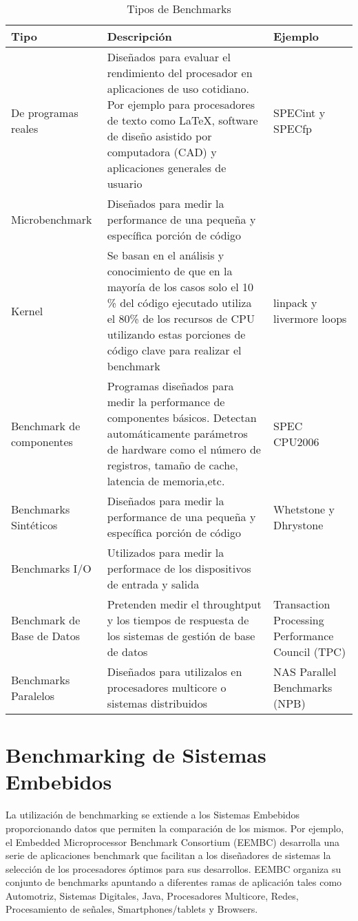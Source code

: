 \begin {table}[!h]
\begin{tabular}{ p{2.5cm} p{8cm} p{3cm} }
\hline 
\rowcolor[gray]{0.8} Tipo & Descripción & Ejemplo \\
\hline
De programas reales & Diseñados para evaluar el
rendimiento del procesador en aplicaciones de uso
cotidiano. Por ejemplo para procesadores de texto como \LaTeX, software
de diseño asistido por computadora (CAD) y
aplicaciones generales de usuario & SPECint y SPECfp\\
\hline
Microbenchmark & Diseñados para medir la performance
de una pequeña y específica porción de código \\
\hline
Kernel & Se basan en el análisis y conocimiento de
que en la mayoría de los casos solo el 10 \% del
código ejecutado utiliza el 80\% de los recursos de
CPU utilizando estas porciones de código clave para
realizar el benchmark & linpack y
livermore loops\\
\hline
Benchmark de componentes & Programas diseñados para
medir la performance de componentes básicos. Detectan
automáticamente parámetros de hardware como el número
de registros, tamaño de cache, latencia de
memoria,etc. & SPEC CPU2006\\
\hline
Benchmarks Sintéticos & Diseñados para medir la
performance de una pequeña y específica porción de
código & Whetstone y Dhrystone\\
\hline
Benchmarks I/O & Utilizados para medir la performace
de los dispositivos de entrada y salida & \\
\hline
Benchmark de Base de Datos & Pretenden medir el
throughtput y los tiempos de respuesta de los sistemas
de gestión de base de datos & Transaction Processing
Performance Council (TPC)\\
\hline
Benchmarks Paralelos & Diseñados para utilizalos
en procesadores multicore o sistemas distribuidos &
NAS Parallel Benchmarks (NPB)\\
\hline
\end{tabular}
\caption {Tipos de Benchmarks}
\label{tab:bench}
\end{table}

\section{Benchmarking de Sistemas Embebidos}

La utilización de benchmarking se extiende a los Sistemas Embebidos
proporcionando datos que permiten la comparación de los mismos. Por
ejemplo, el Embedded Microprocessor Benchmark Consortium (EEMBC)
desarrolla una serie de aplicaciones benchmark que facilitan a los
diseñadores de sistemas la selección de los procesadores óptimos para
sus desarrollos. EEMBC organiza su conjunto de benchmarks apuntando a
diferentes ramas de aplicación tales como Automotriz, Sistemas
Digitales, Java, Procesadores Multicore, Redes, Procesamiento de
señales, Smartphones/tablets y Browsers.
	
